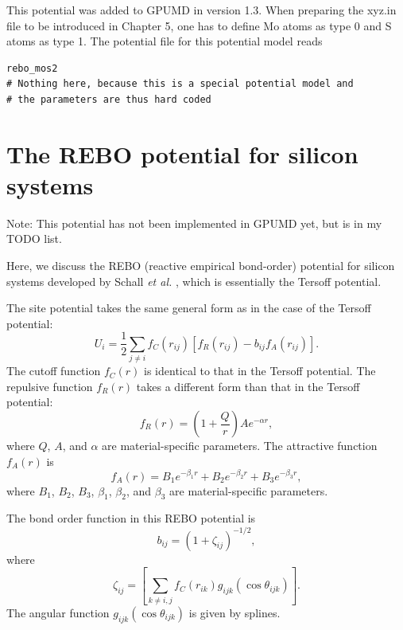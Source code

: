 \documentclass[12pt,a4paper]{report}
\begin{document}
This potential was added to GPUMD in version 1.3. When preparing the xyz.in file to be introduced in Chapter 5, one has to define Mo atoms as type 0 and S atoms as type 1. The potential file for this potential model reads
\begin{verbatim}
rebo_mos2
# Nothing here, because this is a special potential model and 
# the parameters are thus hard coded
\end{verbatim}



\section{The REBO potential for silicon systems}


Note: This potential has not been implemented in GPUMD yet, but is in my TODO list.

Here, we discuss the REBO (reactive empirical bond-order) potential for silicon systems developed by Schall \textit{et al.} \cite{schall2008prb},  which  is essentially the Tersoff potential. 


The site potential takes the same general form as in the case of the Tersoff potential:
\begin{equation}
U_i =  \frac{1}{2} \sum_{j \neq i} f_C(r_{ij}) \left[ f_R(r_{ij}) - b_{ij} f_A(r_{ij}) \right].
\end{equation}
The cutoff function $f_{C}(r)$ is identical to that in the Tersoff potential. The repulsive function $f_{R}(r)$ takes a different form than that in the Tersoff potential:
\begin{equation}
f_{R}(r) = \left(1+\frac{Q}{r}\right) A e^{-\alpha r},
\end{equation}
where $Q$, $A$, and $\alpha$ are material-specific parameters. The attractive function $f_{A}(r)$ is
\begin{equation}
f_{A}(r) = B_1 e^{-\beta_1 r} + B_2 e^{-\beta_2 r} + B_3 e^{-\beta_3 r},
\end{equation}
where $B_1$, $B_2$, $B_3$, $\beta_1$, $\beta_2$, and $\beta_3$ are material-specific parameters.

The bond order function in this REBO potential is
\begin{equation}
b_{ij} =\left(1 + \zeta_{ij}\right)^{-1/2},
\end{equation}
where
\begin{equation}
\zeta_{ij} = \left[ \sum_{k\neq i, j} f_C(r_{ik}) g_{ijk}(\cos\theta_{ijk}) \right].
\end{equation}
The angular function  $g_{ijk}(\cos\theta_{ijk})$ is given by splines.
\end{document}

